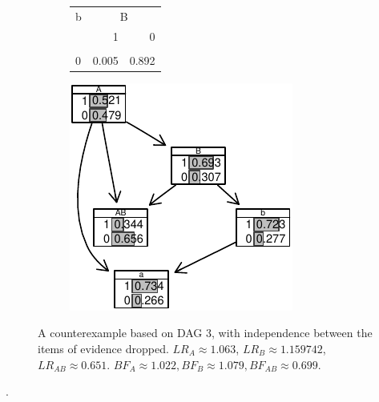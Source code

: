\documentclass[
  10pt,
  dvipsnames,enabledeprecatedfontcommands]{scrartcl}
\begin{document}
\begin{figure}
\begin{subfigure}[ht!]{0.45\textwidth}
\begin{tabular}{lrr}
\toprule
\multicolumn{1}{c}{b} & \multicolumn{2}{c}{B} \\
  & 1 & 0\\
\midrule
\cellcolor{gray!6}{1} & \cellcolor{gray!6}{0.995} & \cellcolor{gray!6}{0.108}\\
0 & 0.005 & 0.892\\
\bottomrule
\end{tabular}

\normalsize 


\end{subfigure} 
\hspace{5mm}\begin{subfigure}{0.45\textwidth}

\begin{center}\includegraphics[width=0.7\linewidth]{conjunction-appendix14_files/figure-latex/unnamed-chunk-29-1} \end{center}
\end{subfigure} 
\caption{A counterexample based on \textsf{DAG 3}, with independence between the items of evidence dropped.   $LR_A  \approx 1.063$, $LR_B \approx 1.159742$,  $LR_{AB} \approx 0.651$. $BF_A \approx  1.022, BF_B \approx  1.079, BF_{AB}\approx   0.699$.}
\label{fig:CPTDoubleL}
\end{figure}

.
\end{document}
